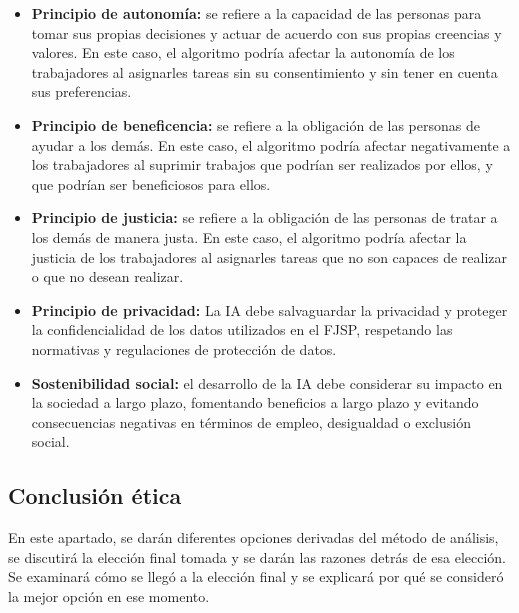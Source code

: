 \begin{itemize}
    \item \textbf{Principio de autonomía:} se refiere a la capacidad de 
    las personas para tomar sus propias decisiones y actuar de acuerdo con sus propias 
    creencias y valores. En este caso, el algoritmo podría afectar la autonomía de los 
    trabajadores al asignarles tareas sin su consentimiento y sin tener en cuenta sus
    preferencias. 
    \item \textbf{Principio de beneficencia:} se refiere a la obligación 
    de las personas de ayudar a los demás. En este caso, el algoritmo podría afectar
    negativamente a los trabajadores al suprimir trabajos que podrían ser realizados
    por ellos, y que podrían ser beneficiosos para ellos.

    \item \textbf{Principio de justicia:} se refiere a la obligación de las
    personas de tratar a los demás de manera justa. En este caso, el algoritmo podría afectar
    la justicia de los trabajadores al asignarles tareas que no son capaces de realizar o que
    no desean realizar.

    \item \textbf{Principio de privacidad:} La IA debe salvaguardar la privacidad y proteger 
    la confidencialidad de los datos utilizados en el FJSP, respetando las normativas y 
    regulaciones de protección de datos.

    \item \textbf{Sostenibilidad social:} el desarrollo de la IA debe considerar su 
    impacto en la sociedad a largo plazo, fomentando beneficios a largo plazo y evitando 
    consecuencias negativas en términos de empleo, desigualdad o exclusión social.

\end{itemize}

\subsection{Conclusión ética}
En este apartado, se darán diferentes opciones derivadas del método de análisis, 
se discutirá la elección final tomada y se darán las razones detrás de esa elección. 
Se examinará cómo se llegó a la elección final y se explicará por qué se consideró 
la mejor opción en ese momento.

